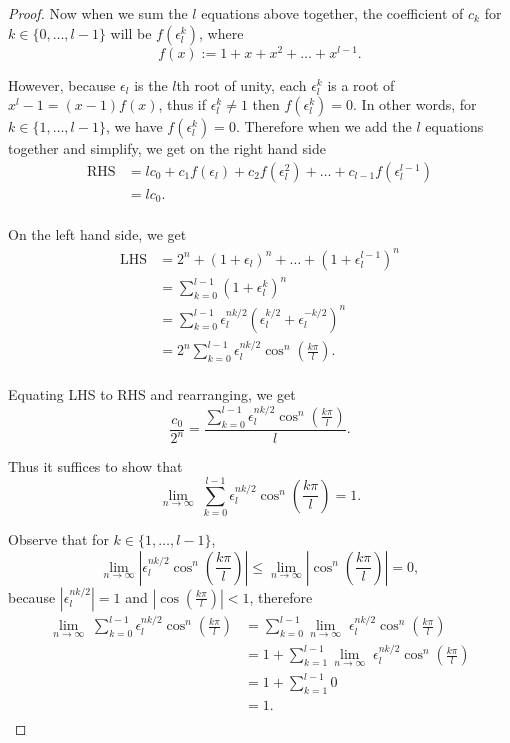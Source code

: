 \documentclass{article}
\begin{document}
\begin{enumerate}[label={\bf Q\arabic*:}]
\begin{proof}
      Now when we sum the $l$ equations above together, the coefficient of
      $c_k$ for $k\in\{0,\ldots,l-1\}$ will be $f(\epsilon_l^k)$, where
      \[f(x):=1+x+x^2+\ldots+x^{l-1}.\]

      However, because $\epsilon_l$ is the $l$th root of unity,
      each $\epsilon_l^k$ is a root of $x^l-1=(x-1)f(x)$, thus if
      $\epsilon_l^k\neq1$ then $f(\epsilon_l^k)=0$. In other words, for
      $k\in\{1,\ldots,l-1\}$, we have $f(\epsilon_l^k)=0$. Therefore when
      we add the $l$ equations together and simplify, we get on the
      right hand side
      \begin{align*}
        \text{RHS} &=lc_0 +c_1f(\epsilon_l) +c_2f(\epsilon_l^2) +\ldots
          +c_{l-1}f(\epsilon_l^{l-1})\\
        &=lc_0.\\
      \end{align*}

      On the left hand side, we get
      \begin{align*}
        \text{LHS} &=2^n+(1+\epsilon_l)^n+\ldots+(1+\epsilon_l^{l-1})^n\\
        &=\sum_{k=0}^{l-1}(1+\epsilon_l^k)^n\\
        &=\sum_{k=0}^{l-1}
          \epsilon_l^{nk/2}(\epsilon_l^{k/2}+\epsilon_l^{-k/2})^n\\
        &=2^n\sum_{k=0}^{l-1}
          \epsilon_l^{nk/2}\cos^n\left(\frac{k\pi}{l}\right).\\
      \end{align*}

      Equating LHS to RHS and rearranging, we get
      \[\frac{c_0}{2^n}
      =\frac{\sum_{k=0}^{l-1}
      \epsilon_l^{nk/2}\cos^n\left(\frac{k\pi}{l}\right)}{l}.\]

      Thus it suffices to show that 
      \[\lim_{n\rightarrow\infty}\; \sum_{k=0}^{l-1}
      \epsilon_l^{nk/2}\cos^n\left(\frac{k\pi}{l}\right) =1.\]

      Observe that for $k\in\{1,\ldots,l-1\}$,
      \[\lim_{n\rightarrow\infty}
      \left|\epsilon_l^{nk/2} \cos^n\left(\frac{k\pi}{l}\right)\right|
      \leq\lim_{n\rightarrow\infty}
      \left|\cos^n\left(\frac{k\pi}{l}\right)\right|=0,\]
      because $|\epsilon_l^{nk/2}|=1$ and
      $\left|\cos\left(\frac{k\pi}{l}\right)\right|<1$, therefore
      \begin{align*}
        \lim_{n\rightarrow\infty}\; \sum_{k=0}^{l-1}
          \epsilon_l^{nk/2}\cos^n\left(\frac{k\pi}{l}\right)
        &=\sum_{k=0}^{l-1} \lim_{n\rightarrow\infty}\;
          \epsilon_l^{nk/2}\cos^n\left(\frac{k\pi}{l}\right)\\
        &=1+\sum_{k=1}^{l-1} \lim_{n\rightarrow\infty}\;
          \epsilon_l^{nk/2}\cos^n\left(\frac{k\pi}{l}\right)\\
        &=1+\sum_{k=1}^{l-1}0\\
        &=1.\\
      \end{align*}
    \end{proof}
\end{enumerate}
\end{document}
